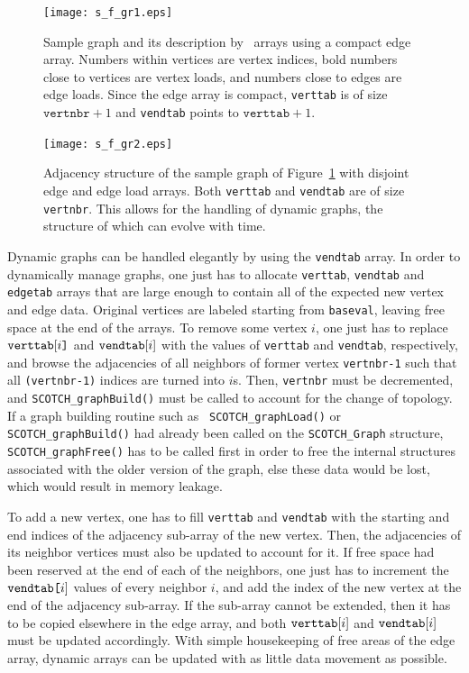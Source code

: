 \begin{figure}
\centering\texttt{[image: s\_f\_gr1.eps]}
\caption{Sample graph and its description by \libscotch\ arrays using
a compact edge array. Numbers within vertices are vertex indices, bold
numbers close to vertices are vertex loads, and numbers close to edges
are edge loads. Since the edge array is compact, {\tt verttab} is of
size $\mathtt{vertnbr} + 1$ and {\tt vendtab} points to
$\mathtt{verttab} + 1$.}
\label{fig-lib-graf-one}
\end{figure}

\begin{figure}
\centering\texttt{[image: s\_f\_gr2.eps]}
\caption{Adjacency structure of the sample graph of
Figure~\protect\ref{fig-lib-graf-one} with disjoint edge and
edge load arrays. Both {\tt verttab} and {\tt vendtab} are of
size {\tt vertnbr}. This allows for the handling of dynamic
graphs, the structure of which can evolve with time.}
\label{fig-lib-graf-two}
\end{figure}

Dynamic graphs can be handled elegantly by using the {\tt vendtab}
array. In order to dynamically manage graphs, one just has to allocate
{\tt verttab}, {\tt vendtab} and {\tt edgetab} arrays that are large
enough to contain all of the expected new vertex and edge
data. Original vertices are labeled starting from {\tt baseval},
leaving free space at the end of the arrays. To remove some vertex
$i$, one just has to replace ${\tt verttab}\mathtt{[}i\mbox{\tt
]}$ and ${\tt vendtab}\mathtt{[}i\mathtt{]}$ with the values of
{\tt verttab} and {\tt vendtab}, respectively, and browse the adjacencies of all neighbors of
former vertex {\tt vertnbr-1} such that all {\tt (vertnbr-1)} indices
are turned into $i$s. Then, {\tt vertnbr} must be decremented, and
{\tt SCOTCH\_\lbt graphBuild()} must be called to account for the
change of topology. If a graph building routine such as {\tt
SCOTCH\_\lbt graph\lbt Load()} or {\tt SCOTCH\_\lbt graph\lbt Build()}
had already been called on the {\tt SCOTCH\_\lbt Graph} structure,
{\tt SCOTCH\_\lbt graph\lbt Free()} has to be called first in order to
free the internal structures associated with the older version of the
graph, else these data would be lost, which would result in memory
leakage.

To add a new vertex, one has to fill {\tt verttab} and {\tt vendtab} with the starting and end
indices of the adjacency sub-array of the new vertex. Then, the
adjacencies of its neighbor vertices must also be updated to account
for it. If free space had been reserved at the end of each of the
neighbors, one just has to increment the ${\tt vendtab}\mbox{\tt
[}i\mathtt{]}$ values of every neighbor $i$, and add the index of
the new vertex at the end of the adjacency sub-array. If the sub-array
cannot be extended, then it has to be copied elsewhere in the edge
array, and both ${\tt verttab}\mathtt{[}i\mathtt{]}$ and ${\tt
vendtab}\mathtt{[}i\mathtt{]}$ must be updated accordingly. With
simple housekeeping of free areas of the edge array, dynamic arrays
can be updated with as little data movement as possible.

